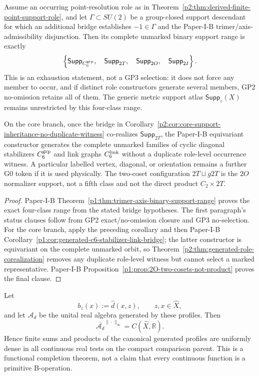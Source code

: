 \documentclass[11pt,a4paper]{article}
\begin{document}
\begin{corollary}
\label{p2:cor:conditional-trimer-axis-support-exhaustion}
Assume an occurring point-resolution role as in
Theorem~\ref{p2:thm:derived-finite-point-support-role}, and let
\(\Gamma\subset SU(2)\) be a group-closed support descendant for which an
additional bridge establishes \(-1\in\Gamma\) and the Paper-I-B
trimer/axis-admissibility disjunction.  Then its complete unmarked binary
support range is exactly
\[
 \left\{
   \mathsf{Supp}_{C_6^{\rm grp}},\quad
   \mathsf{Supp}_{2T},\quad
   \mathsf{Supp}_{2O},\quad
   \mathsf{Supp}_{2I}
 \right\}.
\]
This is an exhaustion statement, not a GP3 selection: it does not force any
member to occur, and if distinct role constructors generate several members,
GP2 no-omission retains all of them.  The generic metric support atlas
\(\mathsf{Supp}_\varepsilon(X)\) remains unrestricted by this four-class
range.

On the core branch, once the bridge in
Corollary~\ref{p2:cor:core-support-inheritance-no-duplicate-witness}
co-realizes \(\mathsf{Supp}_{2T}\), the Paper-I-B equivariant constructor
generates the complete unmarked families of cyclic diagonal stabilizers
\(C_6^{\rm grp}\) and link graphs \(C_6^{\rm link}\) without a duplicate
role-level occurrence witness.  A particular labelled vertex, diagonal, or
orientation remains a further G0 token if it is used physically.  The
two-coset configuration \(2T\sqcup g2T\) is the \(2O\) normalizer support,
not a fifth class and not the direct product \(C_2\times2T\).
\end{corollary}

\begin{proof}
Paper-I-B Theorem~\ref{p1:thm:trimer-axis-binary-support-range} proves the exact
four-class range from the stated bridge hypotheses.  The first paragraph's
status clauses follow from GP2 exact/no-omission closure and GP3 no-selection.
For the core branch, apply the preceding corollary and then Paper-I-B
Corollary~\ref{p1:cor:generated-c6-stabilizer-link-bridge}; the latter
constructor is equivariant on the complete unmarked orbit, so
Theorem~\ref{p2:thm:generated-role-corealization} removes any duplicate
role-level witness but cannot select a marked representative.  Paper-I-B
Proposition~\ref{p1:prop:2O-two-cosets-not-product} proves the final clause.
\end{proof}

\begin{theorem}
\label{p2:thm:generated-test-algebra-completion}
Let
\[
 b_z(x):=\widehat d(x,z),\qquad z,x\in\widehat X,
\]
and let \(\mathcal A_d\) be the unital real algebra generated by these
profiles.  Then
\[
 \overline{\mathcal A_d}^{\|\cdot\|_\infty}
 =C(\widehat X,\mathbb R).
\]
Hence finite sums and products of the canonical generated profiles are
uniformly dense in all continuous real tests on the compact comparison parent.  This
is a functional completion theorem, not a claim that every continuous
function is a primitive B-operation.
\end{theorem}
\end{document}

